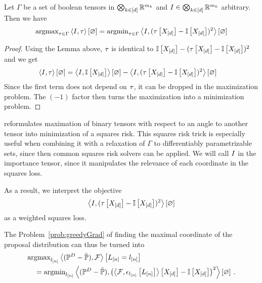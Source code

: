 \begin{theorem}\label{the:reweightedLeastSquares}
	Let $\Gamma$ be a set of boolean tensors in $\bigotimes_{k\in[d]} \mathbb{R}^{m_{k}}$ and $I\in\bigotimes_{k\in[d]} \mathbb{R}^{m_{k}}$ arbitrary.
	Then we have
	\begin{align}
		\mathrm{argmax}_{\tau\in\Gamma} \left\langle I,\tau\right\rangle \left[ \varnothing \right] 
		= \mathrm{argmin}_{\tau\in\Gamma} \left\langle I, (\tau\left[X_{[d]}\right]-\mathbb{I}\left[X_{[d]}\right])^2\right\rangle \left[ \varnothing \right]
	\end{align} 
\end{theorem}
\begin{proof}
	Using the Lemma above, $\tau$ is identical to $\mathbb{I}\left[X_{[d]}\right]-(\tau\left[X_{[d]}\right]-\mathbb{I}\left[X_{[d]}\right])^2$ and we get
	\begin{align*}
		 \left\langle I,\tau\right\rangle \left[ \varnothing \right] 
		 &=  \left\langle I,\mathbb{I}\left[X_{[d]}\right]\right\rangle \left[ \varnothing \right]-\left\langle I,(\tau\left[X_{[d]}\right]-\mathbb{I}\left[X_{[d]}\right])^2\right\rangle \left[ \varnothing \right] 
	\end{align*}
	Since the first term does not depend on $\tau$, it can be dropped in the maximization problem.
	The $(-1)$ factor then turns the maximization into a minimization problem.
\end{proof}

 reformulates maximation of binary tensors with respect to an angle to another tensor into minimization of a squares risk.
This squares risk trick is especially useful when combining it with a relaxation of $\Gamma$ to differentiably parametrizable sets, since then common squares risk solvers can be applied.
We will call $I$ in the  importance tensor, since it manipulates the relevance of each coordinate in the squares loss.

%
As a result, we interpret the objective
	\[ \left\langle I, (\tau\left[X_{[d]}\right]-\mathbb{I}\left[X_{[d]}\right])^2\right\rangle \left[ \varnothing \right] \]
as a weighted squares loss.

\begin{example}
	The Problem~\ref{prob:greedyGrad} of finding the maximal coordinate of the proposal distribution can thus be turned into
	\begin{align*}
		&\mathrm{argmax}_{l_{[n]}} \left\langle (\mathbb{P}^{D}-\tilde{\mathbb{P}}),\mathcal{F}\right\rangle \left[ L_{[n]}=l_{[n]} \right]  \\
		&\quad = \mathrm{argmin}_{l_{[n]}} \left\langle (\mathbb{P}^{D}-\tilde{\mathbb{P}}),
		\left(\left\langle \mathcal{F},\epsilon_{l_{[n]}}\left[L_{[n]}\right]\right\rangle \left[ X_{[d]} \right]-\mathbb{I}\left[X_{[d]}\right]\right)^2\right\rangle \left[ \varnothing \right] \, . 
	\end{align*}
\end{example}


